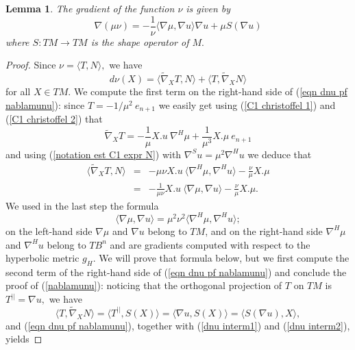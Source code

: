 \documentclass[10pt,reqno,oneside]{amsart}
\newtheorem{lem}{Lemma}[section]
\theoremstyle{definition}
\theoremstyle{remark}
\begin{document}
\begin{lem}\label{lem nablamunu}
The gradient of the function $\nu$ is given by
\begin{equation}\label{nablamunu}
\nabla(\mu\nu)=-\frac{1}{\nu}\langle\nabla\mu,\nabla u\rangle\nabla u+\mu S(\nabla u)
\end{equation}
where $S:TM\rightarrow TM$ is the shape operator of $M.$
\end{lem}
\begin{proof}
Since $\nu=\langle T,N\rangle,$ we have
\begin{equation}\label{eqn dnu pf nablamunu}
d\nu(X)=\langle\widetilde{\nabla}_XT,N\rangle+\langle T,\widetilde{\nabla}_XN\rangle
\end{equation}
for all $X\in TM$. We compute the first term on the right-hand side of (\ref{eqn dnu pf nablamunu}): since $T=-1/\mu^2\ e_{n+1}$ we easily get using (\ref{C1 christoffel 1}) and (\ref{C1 christoffel 2}) that
$$\widetilde{\nabla}_XT=-\frac{1}{\mu}X.u\ \nabla^H\mu+\frac{1}{\mu^3}X.\mu\ e_{n+1}$$
and using (\ref{notation est C1 expr N}) with $\nabla^Su=\mu^2\nabla^Hu$ we deduce that
\begin{eqnarray}
\langle\widetilde{\nabla}_XT,N\rangle&=&-\mu\nu X.u\ \langle\nabla^H\mu,\nabla^H u\rangle-\frac{\nu}{\mu}X.\mu\nonumber\\
&=&-\frac{1}{\mu\nu} X.u\ \langle\nabla\mu,\nabla u\rangle-\frac{\nu}{\mu}X.\mu.\label{dnu interm1}
\end{eqnarray}
We used in the last step the formula
\begin{equation}\label{pf lem grad nu eqn interm} 
\langle\nabla\mu,\nabla u\rangle=\mu^2\nu^2\langle\nabla^H\mu,\nabla^H u\rangle;
\end{equation}
on the left-hand side $\nabla\mu$ and $\nabla u$ belong to $TM$, and on the right-hand side $\nabla^H\mu$ and $\nabla^H u$ belong to $TB^n$ and are gradients computed with respect to the hyperbolic metric $g_H.$ We will prove that formula below, but we first compute the second term of the right-hand side of (\ref{eqn dnu pf nablamunu}) and conclude the proof of (\ref{nablamunu}): noticing that the orthogonal projection of $T$ on $TM$ is $T^{||}=\nabla u,$ we have
\begin{equation}\label{dnu interm2}
\langle T,\widetilde{\nabla}_XN\rangle=\langle T^{||},S(X)\rangle=\langle\nabla u,S(X)\rangle=\langle S(\nabla u),X\rangle,
\end{equation}
and (\ref{eqn dnu pf nablamunu}), together with (\ref{dnu interm1}) and (\ref{dnu interm2}), yields

\end{proof}
\end{document}
